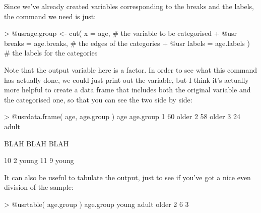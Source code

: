 Since we've already created variables corresponding to the breaks and the labels, the command we need is just:
\begin{rblock1}
> @usr{age.group <- cut( x = age, }              # the variable to be categorised
+ @usr{                  breaks = age.breaks,}   # the edges of the categories
+ @usr{                  labels = age.labels )}  # the labels for the categories

\end{rblock1}
Note that the output variable here is a factor. In order to see what this command has actually done, we could just print out the  variable, but I think it's actually more helpful to create a data frame that includes both the original variable and the categorised one, so that you can see the two side by side:
\begin{rblock1}
> @usr{data.frame( age, age.group )}
   age age.group
1   60     older
2   58     older
3   24     adult

BLAH BLAH BLAH

10   2     young
11   9     young
\end{rblock1}
It can also be useful to tabulate the output, just to see if you've got a nice even division of the sample:
\begin{rblock1}
> @usr{table( age.group )}
age.group
young adult older 
    2     6     3 
\end{rblock1}

